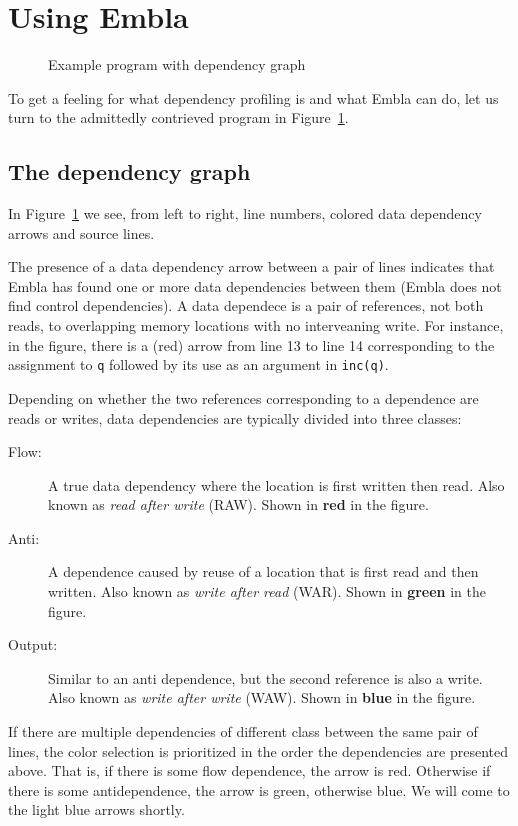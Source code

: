 \section{Using Embla}

\begin{figure} 
\small

\caption{Example program with dependency graph} \label{ffirstex}
\end{figure}

To get a feeling for what dependency profiling is and what Embla can do, 
let us turn to the admittedly contrieved program in Figure~\ref{ffirstex}. 

\subsection{The dependency graph}

In Figure~\ref{ffirstex} we see, from 
left to right, line numbers, colored data dependency arrows and source 
lines. 

The presence of a data dependency arrow between a pair of lines indicates
that Embla has found one or more data dependencies between them
(Embla does not find control dependencies). A data dependece is a pair
of references, not both reads, to overlapping memory
locations with no interveaning write. For instance, in the figure, 
there is a (red) arrow from line 13 to line 14 corresponding to
the assignment to {\tt q} followed by its use as an argument in 
{\tt inc(q)}.

Depending on whether the two references corresponding to a dependence
are reads or writes, data dependencies are typically divided into 
three classes:
\begin{description}
\item[Flow:]
A true data dependency where the location is first written then
read. Also known as {\em read after write} (RAW). Shown in 
{\bf \color{red} red} in the figure.
\item[Anti:]
A dependence caused by reuse of a location that is first read and then
written. Also known as {\em write after read} (WAR). Shown in 
{\bf \color{green} green} in the figure.
\item[Output:]
Similar to an anti dependence, but the second reference is also a
write. Also known as {\em write after write} (WAW). Shown in 
{\bf \color{blue} blue} in the figure.
\end{description}
If there are multiple dependencies of different class between the 
same pair of lines, the color selection is prioritized in the
order the dependencies are presented above. That is, if there is
some flow dependence, the arrow is red. Otherwise if there is 
some antidependence, the arrow is green, otherwise blue. We will 
come to the light blue arrows shortly.



